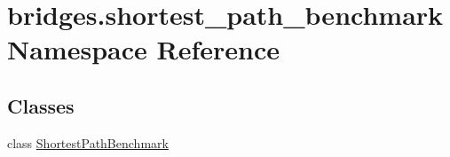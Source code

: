 \hypertarget{namespacebridges_1_1shortest__path__benchmark}{}\section{bridges.\+shortest\+\_\+path\+\_\+benchmark Namespace Reference}
\label{namespacebridges_1_1shortest__path__benchmark}
\subsection*{Classes}
\begin{DoxyCompactItemize}
\item 
class \hyperlink{classbridges_1_1shortest__path__benchmark_1_1_shortest_path_benchmark}{Shortest\+Path\+Benchmark}
\end{DoxyCompactItemize}
